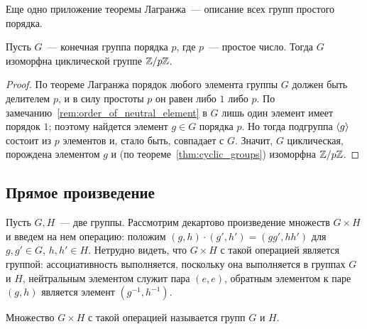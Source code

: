 Еще одно приложение теоремы Лагранжа~--- описание всех групп простого
порядка.

\begin{theorem}\label{thm:groups_of_prime_order}
Пусть $G$~--- конечная группа порядка $p$, где $p$~--- простое число.
Тогда $G$ изоморфна циклической группе $\mathbb Z/p\mathbb Z$.
\end{theorem}
\begin{proof}
По теореме Лагранжа
порядок любого элемента группы $G$ должен быть делителем $p$, и в силу
простоты $p$ он равен либо $1$ либо $p$. По
замечанию~\ref{rem:order_of_neutral_element} в
$G$ лишь один элемент имеет порядок $1$; поэтому найдется элемент
$g\in G$ порядка $p$. Но тогда подгруппа $\langle g\rangle$ состоит из $p$
элементов и, стало быть, совпадает с $G$. Значит, $G$ циклическая,
порождена элементом $g$ и (по теореме~\ref{thm:cyclic_groups})
изоморфна $\mathbb Z/p\mathbb Z$.
\end{proof}

\subsection{Прямое произведение}


Пусть $G,H$~--- две группы.
Рассмотрим декартово произведение множеств $G\times H$ и введем на нем
операцию: положим $(g,h)\cdot (g',h') = (gg',hh')$ для $g,g'\in G$,
$h,h'\in H$.
Нетрудно видеть, что $G\times H$ с такой операцией является группой:
ассоциативность выполняется, поскольку она выполняется в группах $G$ и
$H$, нейтральным элементом служит пара $(e,e)$, обратным элементом к
паре $(g,h)$ является элемент $(g^{-1},h^{-1})$.

\begin{definition}
Множество $G\times H$ с такой операцией называется
 групп $G$
и $H$.
\end{definition}

